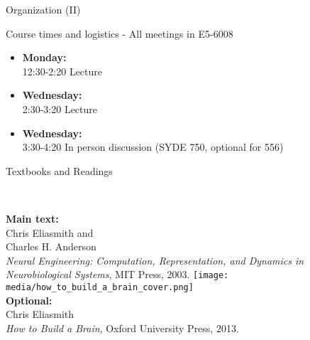 \documentclass[aspectratio=169]{beamer}
\begin{document}
\begin{frame}{Organization (II)}
	\begin{block}{Course times and logistics - All meetings in E5-6008}
		\begin{itemize}
			\item \textbf{Monday:}\\
			12:30-2:20 Lecture
			\item \textbf{Wednesday:}\\
      2:30-3:20 Lecture
			\item \textbf{Wednesday:}\\
			3:30-4:20 In person discussion (SYDE 750, optional for 556) 
		\end{itemize}
	\end{block}

\end{frame}

\begin{frame}{Textbooks and Readings}
	\begin{columns}[T]
			\raggedleft
			\fboxrule=0.4pt\fboxsep=0pt\\
			\small
			\textbf{Main text:}\\
			Chris Eliasmith and\\Charles H. Anderson\\
			\emph{Neural Engineering: Computation, Representation, and Dynamics in Neurobiological Systems}, MIT Press, 2003.
			\raggedleft
			\texttt{[image: media/how\_to\_build\_a\_brain\_cover.png]}\\
			\small
			\textbf{Optional:}\\
			Chris Eliasmith\\
			\emph{How to Build a Brain}, Oxford University Press, 2013.
	\end{columns}
\end{frame}
\end{document}
